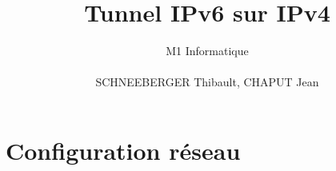 \documentclass[a4paper, 12pt]{article}
\title{Tunnel IPv6 sur IPv4}
\author{M1 Informatique \\\\ SCHNEEBERGER Thibault, CHAPUT Jean}
\date{}
\begin{document}
  \maketitle
  \newpage
  \tableofcontents
  \newpage

  \section{Configuration réseau}
\end{document}
